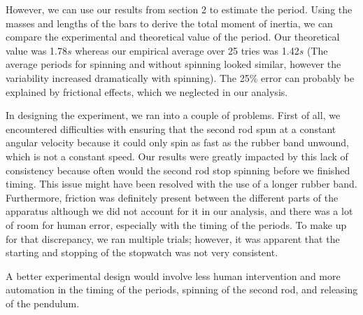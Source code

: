 \documentclass[12pt]{article}
\begin{document}
However, we can use our results from section 2 to estimate the period. Using the masses and lengths of the bars to derive the total moment of inertia, we can compare the experimental and theoretical value of the period. Our theoretical value was 1.78$s$ whereas our empirical average over 25 tries was 1.42$s$ (The average periods for spinning and without spinning looked similar, however the variability increased dramatically with spinning). The 25\% error can probably be explained by frictional effects, which we neglected in our analysis.

In designing the experiment, we ran into a couple of problems.  First of all, we encountered difficulties with ensuring that the second rod spun at a constant angular velocity because it could only spin as fast as the rubber band unwound, which is not a constant speed.  Our results were greatly impacted by this lack of consistency because often would the second rod stop spinning before we finished timing.  This issue might have been resolved with the use of a longer rubber band.  Furthermore, friction was definitely present between the different parts of the apparatus although we did not account for it in our analysis, and there was a lot of room for human error, especially with the timing of the periods.  To make up for that discrepancy, we ran multiple trials; however, it was apparent that the starting and stopping of the stopwatch was not very consistent.  

A better experimental design would involve less human intervention and more automation in the timing of the periods, spinning of the second rod, and releasing of the pendulum.
\end{document}
